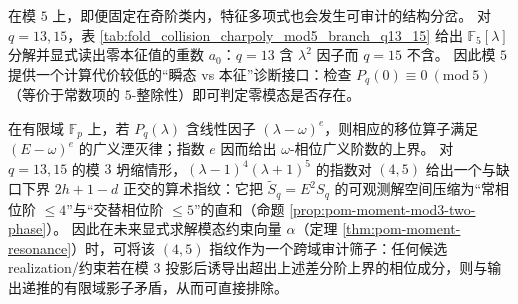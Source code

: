 \begin{remark}\label{rem:pom-charpoly-mod5-branch}
在模 \(5\) 上，即便固定在奇阶类内，特征多项式也会发生可审计的结构分岔。
对 \(q=13,15\)，表 \ref{tab:fold_collision_charpoly_mod5_branch_q13_15} 给出 \(\mathbb{F}_5[\lambda]\) 分解并显式读出零本征值的重数 \(a_0\)：\(q=13\) 含 \(\lambda^2\) 因子而 \(q=15\) 不含。
因此模 \(5\) 提供一个计算代价较低的“瞬态 vs 本征”诊断接口：检查 \(P_q(0)\equiv 0\ (\mathrm{mod}\ 5)\)（等价于常数项的 \(5\)-整除性）即可判定零模态是否存在。
\end{remark}



\begin{remark}\label{rem:pom-modp-factor-exponent-fingerprint}
在有限域 \(\mathbb{F}_p\) 上，若 \(P_q(\lambda)\) 含线性因子 \((\lambda-\omega)^e\)，则相应的移位算子满足 \((E-\omega)^e\) 的广义湮灭律；指数 \(e\) 因而给出 \(\omega\)-相位广义阶数的上界。
对 \(q=13,15\) 的模 \(3\) 坍缩情形，\((\lambda-1)^4(\lambda+1)^5\) 的指数对 \((4,5)\) 给出一个与缺口下界 \(2h+1-d\) 正交的算术指纹：它把 \(\widetilde S_q=E^2S_q\) 的可观测解空间压缩为“常相位阶 \(\le 4\)”与“交替相位阶 \(\le 5\)”的直和（命题 \ref{prop:pom-moment-mod3-two-phase}）。
因此在未来显式求解模态约束向量 \(\alpha\)（定理 \ref{thm:pom-moment-resonance}）时，可将该 \((4,5)\) 指纹作为一个跨域审计筛子：任何候选 realization/约束若在模 \(3\) 投影后诱导出超出上述差分阶上界的相位成分，则与输出递推的有限域影子矛盾，从而可直接排除。
\end{remark}

